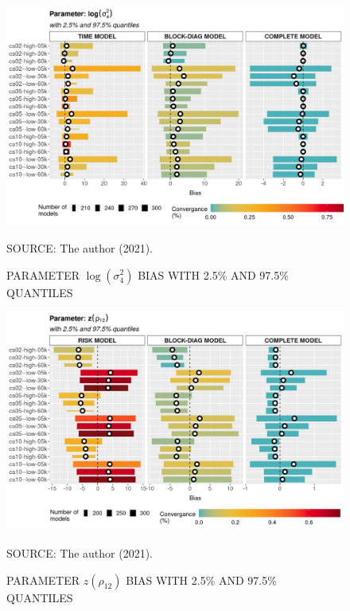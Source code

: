 \documentclass[12pt, %
               openright, %
               oneside, %
               a4paper, %
               chapter=TITLE, %
               section=TITLE, %
               brazil,
               english %
]{abntex2}
\begin{document}
\begin{apendicesenv}
\begin{figure}[H]
 \setlength{\abovecaptionskip}{.0001pt}
 \caption{PARAMETER \(\log(\sigma_{4}^{2})\) BIAS WITH 2.5\% AND 97.5\%
          QUANTILES}
 \vspace{0.2cm}\centering
 \includegraphics[width=\textwidth]{bias2plot-10.png}\\
 \begin{footnotesize}
  SOURCE: The author (2021).
 \end{footnotesize}
 \label{fig:biaslogs2_4}
\end{figure}

\begin{figure}[H]
 \setlength{\abovecaptionskip}{.0001pt}
 \caption{PARAMETER \(z(\rho_{12})\) BIAS WITH 2.5\% AND 97.5\%
          QUANTILES}
 \vspace{0.2cm}\centering
 \includegraphics[width=\textwidth]{bias2plot-11.png}\\
 \begin{footnotesize}
  SOURCE: The author (2021).
 \end{footnotesize}
 \label{fig:biasrhoz12}
\end{figure}


\end{apendicesenv}
\end{document}

